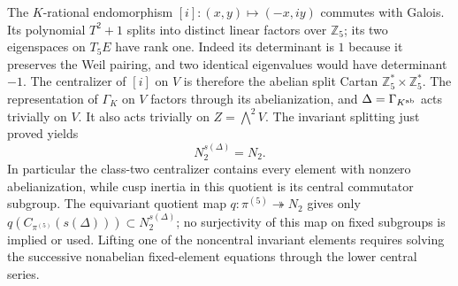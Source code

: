 The $K$-rational endomorphism $[i]:(x,y)\mapsto(-x,iy)$ commutes with Galois. Its polynomial $T^2+1$ splits into distinct linear factors over $\mathbb Z_5$; its two eigenspaces on $T_5E$ have rank one. Indeed its determinant is $1$ because it preserves the Weil pairing, and two identical eigenvalues would have determinant $-1$. The centralizer of $[i]$ on $V$ is therefore the abelian split Cartan $\mathbb Z_5^*\times\mathbb Z_5^*$. The representation of $\Gamma_K$ on $V$ factors through its abelianization, and $\Delta=\Gamma_{K^{\rm ab}}$ acts trivially on $V$. It also acts trivially on $Z=\bigwedge^2V$. The invariant splitting just proved yields
\[
 N_2^{s(\Delta)}=N_2.
\]
In particular the class-two centralizer contains every element with nonzero abelianization, while cusp inertia in this quotient is its central commutator subgroup. The equivariant quotient map $q:\pi^{(5)}\twoheadrightarrow N_2$ gives only
$q(C_{\pi^{(5)}}(s(\Delta)))\subset N_2^{s(\Delta)}$; no surjectivity of this map on fixed subgroups is implied or used. Lifting one of the noncentral invariant elements requires solving the successive nonabelian fixed-element equations through the lower central series.
